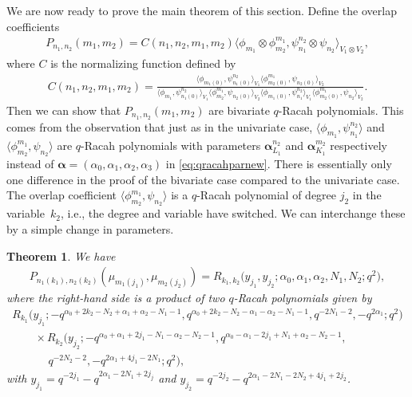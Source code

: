 \documentclass[pdftex]{sigma}
\numberwithin{equation}{section}
\newtheorem{Theorem}{Theorem}[section]
\begin{document}
We are now ready to prove the main theorem of this section. Define the overlap coefficients
\begin{gather}
	P_{n_1,n_2}(m_1,m_2)=C(n_1,n_2,m_1,m_2)\big\langle \phi_{m_1}\otimes \phi_{m_2}^{m_1},\psi_{n_1}^{n_2}\otimes \psi_{n_2}\big\rangle_{V_1\otimes V_2},\label{eq:defbivarqracah}
\end{gather}
where $C$ is the normalizing function defined by
\begin{align}
	C(n_1,n_2,m_1,m_2)=\frac{\big\langle\phi_{m_1(0)},\psi_{n_1(0)}^{n_2}\big\rangle_{V_1} \big\langle\phi_{m_2(0)}^{m_1}, \psi_{n_2(0)}\big\rangle_{V_2}}{\big\langle\phi_{m_1},\psi_{n_1(0)}^{n_2}\big\rangle_{V_1}\big\langle \phi_{m_2}^{m_1},\psi_{n_2(0)}\big\rangle_{V_2}\big\langle\phi_{m_1(0)},\psi_{n_1}^{n_2}\big\rangle_{V_1} \big\langle\phi_{m_2(0)}^{m_1},\psi_{n_2}\big\rangle_{V_2}}.\label{eq:normalizingbivar}
\end{align}
Then we can show that $P_{n_1,n_2}(m_1,m_2)$ are bivariate $q$-Racah polynomials. This comes from the observation that just as in the univariate case, $\big\langle\phi_{m_1},\psi_{n_1}^{n_2}\big\rangle$ and $\big\langle\phi_{m_2}^{m_1},\psi_{n_2}\big\rangle$ are $q$-Racah polynomials with parameters $\bm{\alpha}^{n_2}_{L_1}$ and $\bm{\alpha}_{K_1}^{m_2}$ respectively instead of $\bm{\alpha}=(\alpha_0,\alpha_1,\alpha_2,\alpha_3)$ in \eqref{eq:qracahparnew}. There is essentially only one difference in the proof of the bivariate case compared to the univariate case. The overlap coefficient $\big\langle\phi_{m_2}^{m_1},\psi_{n_2}\big\rangle$ is a $q$-Racah polynomial of degree $j_2$ in the variable~$k_2$, i.e., the degree and variable have switched. We can interchange these by a simple change in parameters.
\begin{Theorem}
	We have
	\begin{gather*}
		P_{n_1(k_1),n_2(k_2)}(\mu_{m_1(j_1)},\mu_{m_2(j_2)})=R_{k_1,k_2}\big(y_{j_1},y_{j_2};\alpha_0,\alpha_1,\alpha_2,N_1,N_2;q^2\big),
	\end{gather*}
	where the right-hand side is a product of two $q$-Racah polynomials given by
	\begin{gather}
R_{k_1}\big(y_{j_1};-q^{\alpha_0+2k_2-N_2+\alpha_1+\alpha_2-N_1-1}, q^{\alpha_0+2k_2-N_2-\alpha_1-\alpha_2-N_1-1}, q^{-2N_1-2},-q^{2\alpha_1};q^2\big)\nonumber\\
\qquad{} \times R_{k_2}\big(y_{j_2};-q^{\alpha_0+\alpha_1+2j_1-N_1-\alpha_2-N_2-1}, q^{\alpha_0-\alpha_1-2j_1+N_1+\alpha_2-N_2-1},\nonumber\\
\qquad\quad \ {} q^{-2N_2-2},-q^{2\alpha_1+4j_1-2N_1};q^2\big),
 \label{eq:bivarqracahmijn}
	\end{gather}
	with $y_{j_1}=q^{-2j_1}-q^{2\alpha_1-2N_1+2j_j}$ and $y_{j_2} = q^{-2j_2}-q^{2\alpha_1-2N_1-2N_2+4j_1+2j_2}$.
\end{Theorem}
\end{document}
